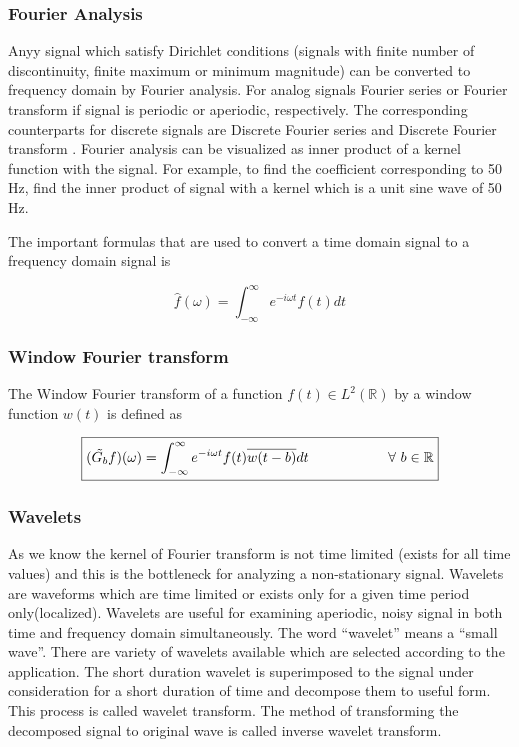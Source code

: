 \documentclass[12pt, a4paper]{article} %
\begin{document}
\BgThispage
\subsubsection{Fourier Analysis}

Anyy signal which satisfy Dirichlet conditions (signals with finite number of discontinuity, finite maximum or minimum magnitude) can be converted to frequency domain by Fourier analysis. For analog signals Fourier series or Fourier transform if signal is periodic or aperiodic, respectively. The corresponding counterparts for discrete signals are Discrete Fourier series and Discrete Fourier transform . Fourier analysis can be visualized as inner product of a kernel function with the signal. For example, to find the coefficient corresponding to 50 Hz, find the inner product of signal with a kernel which is a unit sine wave of 50 Hz.

The important formulas that are used to convert a time domain signal to a frequency domain signal is 

\[\boxed{\hat{f}(\omega) = \int_{-\infty}^{\infty}e^{-i\omega t} f(t) dt}\]

\subsubsection{Window Fourier transform}

The Window Fourier transform of a function $f(t)\in L^2(\mathbb{R})$ by a window function $w(t)$ is defined as

\[\boxed{(\tilde{G_b}f)(\omega) = \int_{-\infty}^{\infty}e^{-i\omega t} f(t)\overline{w(t-b)}dt\hspace*{2cm}\forall\ b\in\mathbb{R}}\]

\subsubsection{Wavelets}

As we know the kernel of Fourier transform is not time limited (exists for all time values) and this is the bottleneck for analyzing a non-stationary signal. Wavelets are waveforms which are time limited or exists only for a given time period only(localized). Wavelets are useful for examining aperiodic, noisy signal in both time and frequency domain simultaneously. The word “wavelet” means a “small wave”. There are variety of wavelets available which are selected according to the application. The short duration wavelet is superimposed to the signal under consideration for a short duration of time and decompose them to useful form. This process is called wavelet transform. The method of transforming the decomposed signal to original wave is called inverse wavelet transform.
\end{document}
